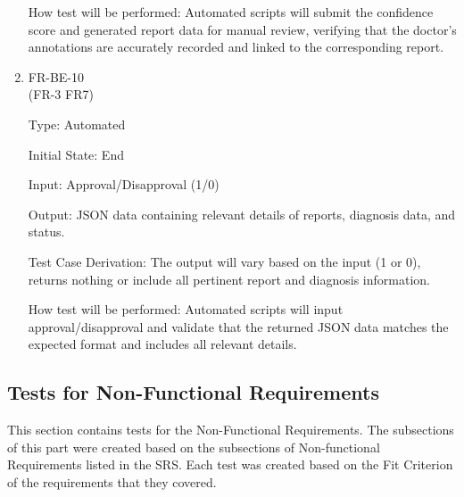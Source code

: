 \documentclass[12pt, titlepage]{article}
\begin{document}
\begin{enumerate}
How test will be performed: Automated scripts will submit the confidence score and generated report data for manual review, verifying that the doctor’s annotations are accurately recorded and linked to the corresponding report.

\item{FR-BE-10\\} (FR-3 FR7)

Type: Automated 
					
Initial State: End
					
Input: Approval/Disapproval (1/0)
					
Output: JSON data containing relevant details of reports, diagnosis data, and status.

Test Case Derivation: The output will vary based on the input (1 or 0), returns nothing or include all pertinent report and diagnosis information.

How test will be performed: Automated scripts will input approval/disapproval and validate that the returned JSON data matches the expected format and includes all relevant details.

\end{enumerate}
\subsection{Tests for Non-Functional Requirements}

This section contains tests for the Non-Functional Requirements. The subsections of this part were created based on the subsections of Non-functional Requirements listed in the SRS. Each test was created based on the Fit Criterion of the requirements that they covered. 
\end{document}
